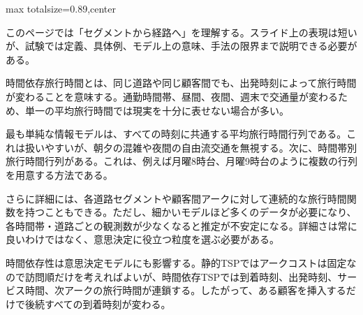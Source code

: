 \begin{minipage}[t]{0.58\textwidth}
\begin{adjustbox}{max totalsize={\textwidth}{0.89\textheight},center}
\begin{minipage}{\textwidth}\scriptsize
{}このページでは「セグメントから経路へ」を理解する。スライド上の表現は短いが、試験では定義、具体例、モデル上の意味、手法の限界まで説明できる必要がある。\par
時間依存旅行時間とは、同じ道路や同じ顧客間でも、出発時刻によって旅行時間が変わることを意味する。通勤時間帯、昼間、夜間、週末で交通量が変わるため、単一の平均旅行時間では現実を十分に表せない場合が多い。\par
最も単純な情報モデルは、すべての時刻に共通する平均旅行時間行列である。これは扱いやすいが、朝夕の混雑や夜間の自由流交通を無視する。次に、時間帯別旅行時間行列がある。これは、例えば月曜8時台、月曜9時台のように複数の行列を用意する方法である。\par
さらに詳細には、各道路セグメントや顧客間アークに対して連続的な旅行時間関数を持つこともできる。ただし、細かいモデルほど多くのデータが必要になり、各時間帯・道路ごとの観測数が少なくなると推定が不安定になる。詳細さは常に良いわけではなく、意思決定に役立つ粒度を選ぶ必要がある。\par
時間依存性は意思決定モデルにも影響する。静的TSPではアークコストは固定なので訪問順だけを考えればよいが、時間依存TSPでは到着時刻、出発時刻、サービス時間、次アークの旅行時間が連鎖する。したがって、ある顧客を挿入するだけで後続すべての到着時刻が変わる。\par

\end{minipage}
\end{adjustbox}
\end{minipage}
